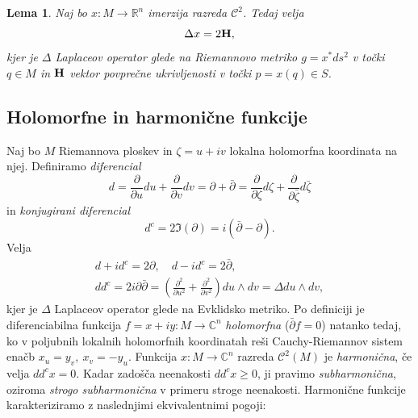 \documentclass[12pt,a4paper,twoside]{article}
\theoremstyle{definition} %
\theoremstyle{plain} %
\newtheorem{lema}[definicija]{Lema}
\numberwithin{equation}{section}  %
\newcommand{\R}{\mathbb R}
\begin{document}
\begin{lema} \label{lema:laplace=2H}
Naj bo $x \colon M \to \R^{n}$ imerzija razreda $\mathcal{C}^2$. Tedaj velja
\begin{equation}
\Delta{x} = 2 \textbf{\textup{H}},
\end{equation}
kjer je $\Delta$ Laplaceov operator glede na Riemannovo metriko $g = x^{*}ds^2$ v točki $q \in M$ in $\textbf{\textup{H}}$ vektor povprečne ukrivljenosti v točki $p = x(q) \in S$.
\end{lema}

\subsection{Holomorfne in harmonične funkcije}
%
Naj bo $M$ Riemannova ploskev in $\zeta = u+iv$ lokalna holomorfna koordinata na njej. 
Definiramo \emph{diferencial} 
\begin{equation}
d = \frac{\partial}{\partial u}du + \frac{\partial}{\partial v}dv = \partial + \bar{\partial} = \frac{\partial}{\partial \zeta}d\zeta + \frac{\partial}{\partial \bar{\zeta}}d\bar{\zeta}
\end{equation}
in \emph{konjugirani diferencial}
\begin{equation}
d^{c} = 2 \Im(\partial) = i(\bar{\partial} - \partial).
\end{equation}
Velja
\begin{gather*}
d + id^{c} = 2\partial , \quad  d - id^{c} = 2\bar{\partial}, \\
dd^{c} = 2i\partial \bar{\partial} = \left( \frac{\partial^2}{\partial u^2} + \frac{\partial^2}{\partial v^2} \right) du \wedge dv = \Delta du \wedge dv,
\end{gather*}
kjer je $\Delta$ Laplaceov operator glede na Evklidsko metriko.\newline
%
Po definiciji je diferenciabilna funkcija $f = x + iy \colon M \to \mathbb{C}^{n}$ \emph{holomorfna} ($\bar{\partial}f = 0$) natanko tedaj, ko v poljubnih lokalnih holomorfnih koordinatah reši Cauchy-Riemannov sistem enačb $x_{u}=y_{v}, \ x_{v}=-y_{u}$.\newline
%
Funkcija $x \colon M \to \mathbb{C}^{n}$ razreda $\mathcal{C}^2(M)$ je \emph{harmonična}, če velja $dd^{c}x=0$.
Kadar zadošča neenakosti $dd^{c}x \geq 0$, ji pravimo \emph{subharmonična}, oziroma \emph{strogo subharmonična} v primeru stroge neenakosti.
Harmonične funkcije karakteriziramo z naslednjimi ekvivalentnimi pogoji:
\end{document}
